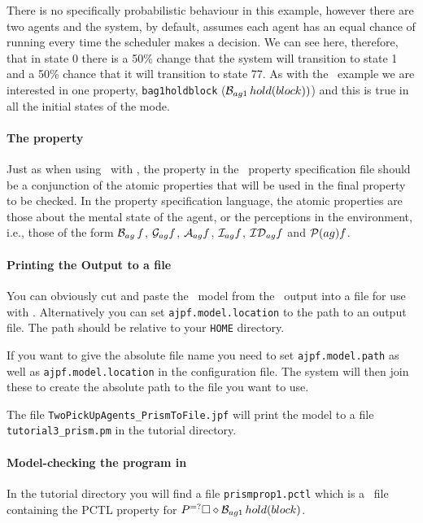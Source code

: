 \documentclass[a4]{article}
\begin{document}
There is no specifically probabilistic behaviour in this example, however there are two agents and the system, by default, assumes each agent has an equal chance of running every time the scheduler makes a decision.  We can see here, therefore, that in state 0 there is a 50\% change that the system will transition to state 1 and a 50\% chance that it will transition to state 77.  As with the \spin\ example we are interested in one property, \texttt{bag1holdblock} ($\mathrm{{\cal B}}_{ag1} \, hold(block))$) and this is true in all the initial states of the mode.

\paragraph{The property} Just as when using \ajpf\ with \spin, the property in the \ajpf\ property specification file should be a conjunction of the atomic properties that will be used in the final property to be checked.  In the property specification language, the atomic properties are those about the mental state of the agent, or the perceptions in the environment, i.e., those of the form $\mathrm{{\cal B}}_{ag} \, f$, $\mathrm{{\cal G}}_{ag} f$, $\mathrm{{\cal A}}_{ag} f$, $\mathrm{{\cal I}}_{ag} f$, $\mathrm{{\cal ID}}_{ag} f$ and $\mathrm{{\cal P}}(ag){f}$.

\paragraph{Printing the Output to a file} You can obviously cut and paste the \prism\ model from the \ajpf\ output into a file for use with \prism.  Alternatively you can set \texttt{ajpf.model.location} to the path to an output file.  The path should be relative to your \texttt{HOME} directory.  

If you want to give the absolute file name you need to set \texttt{ajpf.model.path} as well as \texttt{ajpf.model.location} in the configuration file.  The system will then join these to create the absolute path to the file you want to use.

The file \texttt{TwoPickUpAgents\_PrismToFile.jpf} will print the model to a file \texttt{tutorial3\_prism.pm} in the tutorial directory.

\paragraph{Model-checking the program in \prism}  In the tutorial directory you will find a file \texttt{prismprop1.pctl} which is a \prism\ file containing the PCTL property for $P^{=?}\Box \diamond \mathrm{{\cal B}}_{ag1} \, hold(block)$.  
\end{document}
